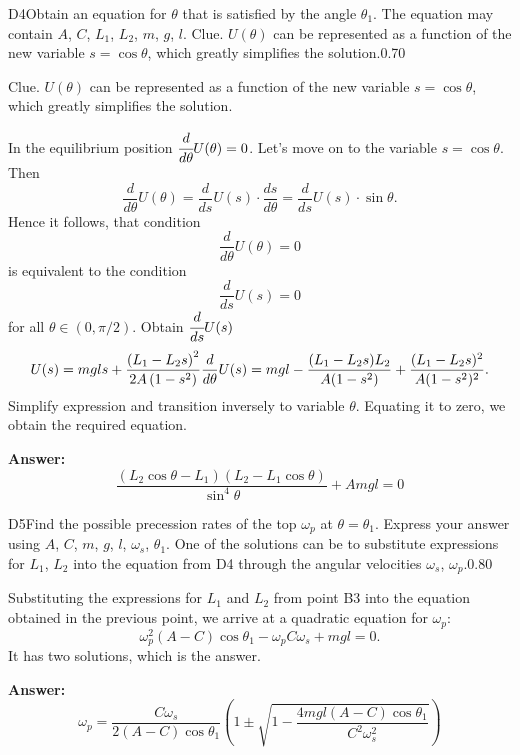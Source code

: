 \documentclass[11pt,a4paper]{article}
\begin{document}
\begin{solcard}{D4}{Obtain an equation for $\theta$ that is satisfied by the angle $\theta_1$. The equation may contain $A$, $C$, $L_1$, $L_2$, $m$, $g$, $l$. Clue. $U(\theta)$ can be represented as a function of the new variable $s = \cos \theta$, which greatly simplifies the solution.}{0.70}

Clue. $U(\theta)$ can be represented as a function of the new variable $s = \cos \theta$, which greatly simplifies the solution.


In the equilibrium position $\cfrac{d}{d\theta}U(\theta) = 0$. Let's move on to the variable $s = \cos \theta$. Then $$\frac{d}{d\theta} U(\theta) = \frac{d}{ds} U(s) \cdot \frac{ds}{d\theta} = \frac{d}{ds}U(s) \cdot \sin\theta.$$ Hence it follows, that condition $$\frac{d}{d\theta}U(\theta) = 0$$ is equivalent to the condition $$\frac{d}{ds} U(s) = 0$$ for all $\theta \in (0, \pi/2)$. Obtain $\cfrac{d}{ds}U(s)$ $$U(s) = mgls + \frac{\left(L_1 - L_2s\right) ^ 2}{2A\left(1-s^2\right)} \\ \frac{d}{d\theta}U(s) = mgl - \frac{(L_1 - L_2s)L_2}{A(1 - s^2)} +\frac{(L_1 - L_2s)^2}{A(1-s^2)^2}.$$Simplify expression and transition inversely to variable $\theta$. Equating it to zero, we obtain the required equation.

\par\smallskip\noindent\textbf{Answer:} $$ \frac{(L_2 \cos \theta - L_1)(L_2 - L_1 \cos \theta)}{\sin^4 \theta} + Amgl = 0 $$
\end{solcard}

\begin{solcard}{D5}{Find the possible precession rates of the top $\omega_p$ at $\theta = \theta_1$. Express your answer using $A$, $C$, $m$, $g$, $l$, $\omega_s$, $\theta_1$. One of the solutions can be to substitute expressions for $L_1$, $L_2$ into the equation from D4 through the angular velocities $\omega_s$, $\omega_p$.}{0.80}

Substituting the expressions for $L_1$ and $L_2$ from point B3 into the equation obtained in the previous point, we arrive at a quadratic equation for $\omega_p$: $$\omega_p^2 (A-C) \cos\theta_1 - \omega_p C\omega_s + mgl = 0.$$ It has two solutions, which is the answer.

\par\smallskip\noindent\textbf{Answer:} $$ \omega_p = \frac{C \omega_s}{2(A-C) \cos \theta_1}\left(1 \pm \sqrt{1 - \frac{4mgl(A-C) \cos\theta_1}{C^2 \omega_s^2}}\right) $$
\end{solcard}
\end{document}

